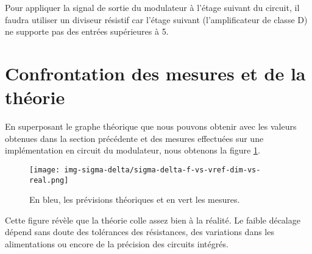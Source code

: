 Pour appliquer la signal de sortie du modulateur
à l'étage suivant du circuit, il faudra utiliser un diviseur
résistif car l'étage suivant (l'amplificateur de classe D)
ne supporte pas des entrées supérieures
à \unit{5}{\volt}.

\section{Confrontation des mesures et de la théorie}
En superposant le graphe théorique que nous pouvons obtenir avec les valeurs
obtenues dans la section précédente
et des mesures effectuées sur une implémentation en circuit
du modulateur, nous obtenons la figure \ref{fig:sigma-delta-f-vs-vref-dim-vs-real}.

\begin{figure}[ht]
	\centering
	\texttt{[image: img-sigma-delta/sigma-delta-f-vs-vref-dim-vs-real.png]}
	\caption{En bleu, les prévisions théoriques et en vert les mesures.}
	\label{fig:sigma-delta-f-vs-vref-dim-vs-real}
\end{figure}

Cette figure révèle que la théorie colle assez bien à la réalité. Le
faible décalage dépend sans doute des tolérances des résistances,
des variations dans les alimentations ou encore de la précision des
circuits intégrés.